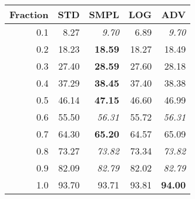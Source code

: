 \documentclass{standalone}
\begin{document}
\begin{tabular}{r|rrrr}
      \toprule
      Fraction & STD & SMPL & LOG & ADV\\
      \midrule
      0.1 & 8.27 & \emph{9.70} & 6.89 & \emph{9.70}\\
  0.2 & 18.23 & \textbf{18.59} & 18.27 & 18.49\\
  0.3 & 27.40 & \textbf{28.59} & 27.60 & 28.18\\
  0.4 & 37.29 & \textbf{38.45} & 37.40 & 38.38\\
  0.5 & 46.14 & \textbf{47.15} & 46.60 & 46.99\\
  0.6 & 55.50 & \emph{56.31} & 55.72 & \emph{56.31}\\
  0.7 & 64.30 & \textbf{65.20} & 64.57 & 65.09\\
  0.8 & 73.27 & \emph{73.82} & 73.34 & \emph{73.82}\\
  0.9 & 82.09 & \emph{82.79} & 82.02 & \emph{82.79}\\
  1.0 & 93.70 & 93.71 & 93.81 & \textbf{94.00}\\
  \bottomrule
\end{tabular}
\end{document}
